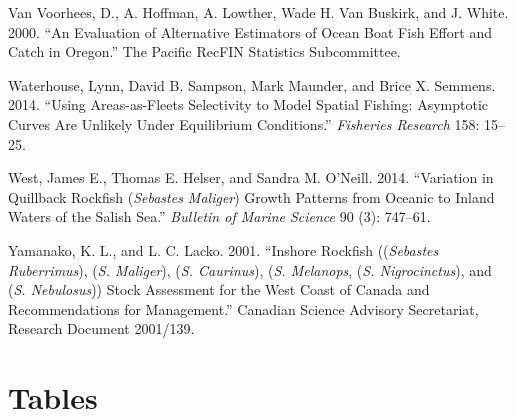 \documentclass[11pt,
  english,
  a4paper,
]{article}
\begin{document}
\leavevmode\hypertarget{ref-van_voorhees_evaluation_2000}{}%
Van Voorhees, D., A. Hoffman, A. Lowther, Wade H. Van Buskirk, and J. White. 2000. ``An Evaluation of Alternative Estimators of Ocean Boat Fish Effort and Catch in Oregon.'' The Pacific RecFIN Statistics Subcommittee.

\leavevmode\hypertarget{ref-Waterhouseetal_spatialSelex_2014}{}%
Waterhouse, Lynn, David B. Sampson, Mark Maunder, and Brice X. Semmens. 2014. ``Using Areas-as-Fleets Selectivity to Model Spatial Fishing: Asymptotic Curves Are Unlikely Under Equilibrium Conditions.'' \emph{Fisheries Research} 158: 15--25.

\leavevmode\hypertarget{ref-Westetal_2014}{}%
West, James E., Thomas E. Helser, and Sandra M. O'Neill. 2014. ``Variation in Quillback Rockfish (\emph{Sebastes Maliger}) Growth Patterns from Oceanic to Inland Waters of the Salish Sea.'' \emph{Bulletin of Marine Science} 90 (3): 747--61.

\leavevmode\hypertarget{ref-YamanakaandLacko_rockfish_2001}{}%
Yamanako, K. L., and L. C. Lacko. 2001. ``Inshore Rockfish ((\emph{Sebastes Ruberrimus}), (\emph{S. Maliger}), (\emph{S. Caurinus}), (\emph{S. Melanops}, (\emph{S. Nigrocinctus}), and (\emph{S. Nebulosus})) Stock Assessment for the West Coast of Canada and Recommendations for Management.'' Canadian Science Advisory Secretariat, Research Document 2001/139.

\leavevmode\tagmcend\tagstructend

\clearpage


\hypertarget{tables}{%
\section{Tables}\label{tables}}

\leavevmode\tagmcend\tagstructend



\newpage

\begingroup\fontsize{10}{12}\selectfont
\begingroup\fontsize{10}{12}\selectfont
\end{document}
